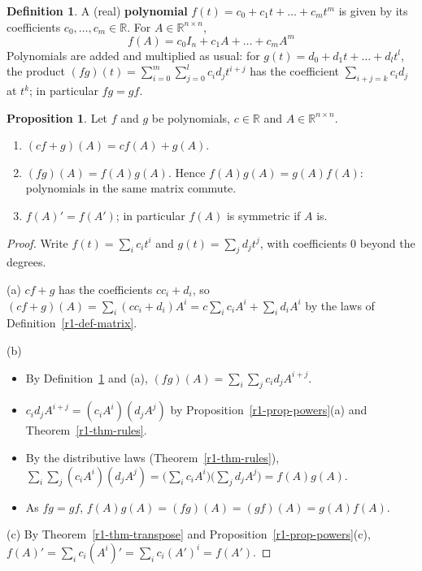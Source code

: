 \documentclass[12pt]{article}
\newcommand{\R}{\mathbb R}
\theoremstyle{definition}
\newtheorem{proposition}[theorem]{Proposition}
\newtheorem{definition}[theorem]{Definition}
\begin{document}
\begin{definition}\label{r1-def-poly}
A (real) \textbf{polynomial} \(f(t)=c_0+c_1t+\dots+c_mt^m\) is given by its coefficients \(c_0,\dots,c_m\in\R\). For
\(A\in\R^{n\times n}\),
\[
f(A)=c_0I_n+c_1A+\dots+c_mA^m
\]
Polynomials are added and multiplied as usual: for \(g(t)=d_0+d_1t+\dots+d_lt^l\), the product
\((fg)(t)=\sum_{i=0}^m\sum_{j=0}^lc_id_jt^{i+j}\) has the coefficient \(\sum_{i+j=k}c_id_j\) at \(t^k\); in
particular \(fg=gf\).
\end{definition}

\begin{proposition}\label{r1-prop-poly}
Let \(f\) and \(g\) be polynomials, \(c\in\R\) and \(A\in\R^{n\times n}\).
\begin{enumerate}
\item \((cf+g)(A)=cf(A)+g(A)\).
\item \((fg)(A)=f(A)g(A)\). Hence \(f(A)g(A)=g(A)f(A)\): polynomials in the same matrix commute.
\item \(f(A)'=f(A')\); in particular \(f(A)\) is symmetric if \(A\) is.
\end{enumerate}
\end{proposition}
\begin{proof}
Write \(f(t)=\sum_ic_it^i\) and \(g(t)=\sum_jd_jt^j\), with coefficients \(0\) beyond the degrees.

(a) \(cf+g\) has the coefficients \(cc_i+d_i\), so \((cf+g)(A)=\sum_i(cc_i+d_i)A^i=c\sum_ic_iA^i+\sum_id_iA^i\) by the
laws of Definition~\ref{r1-def-matrix}.

(b)
\begin{itemize}
\item By Definition~\ref{r1-def-poly} and (a), \((fg)(A)=\sum_i\sum_jc_id_jA^{i+j}\).
\item \(c_id_jA^{i+j}=(c_iA^i)(d_jA^j)\) by Proposition~\ref{r1-prop-powers}(a) and Theorem~\ref{r1-thm-rules}.
\item By the distributive laws (Theorem~\ref{r1-thm-rules}),
\(\sum_i\sum_j(c_iA^i)(d_jA^j)=\bigl(\sum_ic_iA^i\bigr)\bigl(\sum_jd_jA^j\bigr)=f(A)g(A)\).
\item As \(fg=gf\), \(f(A)g(A)=(fg)(A)=(gf)(A)=g(A)f(A)\).
\end{itemize}
(c) By Theorem~\ref{r1-thm-transpose} and Proposition~\ref{r1-prop-powers}(c),
\(f(A)'=\sum_ic_i(A^i)'=\sum_ic_i(A')^i=f(A')\).
\end{proof}
\end{document}
